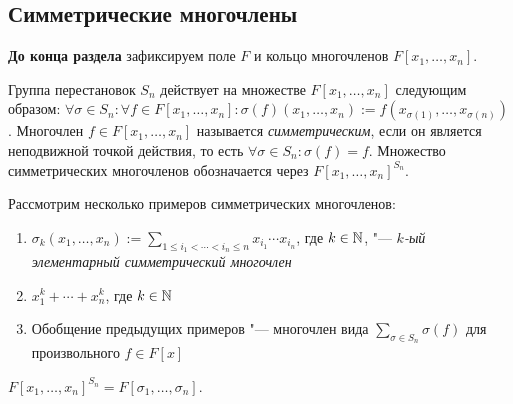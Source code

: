 \subsection{Симметрические многочлены}

\textbf{До конца раздела} зафиксируем поле $F$ и кольцо многочленов $F[x_1, \dotsc, x_n]$.

\begin{definition}
	Группа перестановок $S_n$ действует на множестве $F[x_1, \dotsc, x_n]$ следующим образом: $\forall \sigma \in S_n: \forall f \in F[x_1, \dotsc, x_n]: \sigma(f)(x_1, \dotsc, x_n) := f(x_{\sigma(1)}, \dotsc, x_{\sigma(n)})$. Многочлен $f \in F[x_1, \dotsc, x_n]$ называется \textit{симметрическим}, если он является неподвижной точкой действия, то есть $\forall \sigma \in S_n: \sigma(f) = f$. Множество симметрических многочленов обозначается через $F[x_1, \dotsc, x_n]^{S_n}$.
\end{definition}

\begin{example}
	Рассмотрим несколько примеров симметрических многочленов:
	\begin{enumerate}
		\item $\sigma_k(x_1, \dotsc, x_n) := \sum_{1\le i_1 < \dotsb < i_n \le n}x_{i_1}
		\dotsm x_{i_n}$, где $k \in \mathbb{N}$, "--- \textit{$k$-ый элементарный симметрический многочлен}
		\item $x_1^k + \dotsb + x_n^k$, где $k \in \mathbb{N}$
		\item Обобщение предыдущих примеров "--- многочлен вида $\sum_{\sigma \in S_n}\sigma(f)$ для произвольного $f \in F[x]$
	\end{enumerate}
\end{example}

\begin{theorem}
	$F[x_1, \dotsc, x_n]^{S_n} = F[\sigma_1, \dotsc, \sigma_n]$.
\end{theorem}

